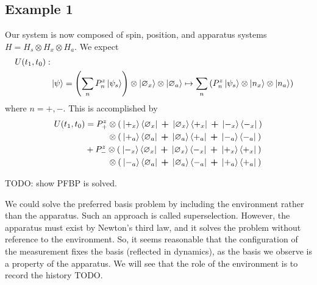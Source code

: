 \subsection{Example 1}
Our system is now composed of spin, position, and apparatus systems $H = H_s \otimes H_x \otimes H_a$. We expect
\begin{align}
    \nonumber U(t_1, t_0): \\
    & \ket{\psi} = \left(\sum_{n} P^z_n\ket{\psi_s}\right) \otimes \ket{\varnothing_x} \otimes \ket{\varnothing_a} \mapsto \sum_{n}\left(P^z_n\ket{\psi_s} \otimes \ket{n_x} \otimes \ket{n_a} \right)
\end{align}
where $n = +, -$. This is accomplished by
\begin{align}
  U(t_1, t_0) &= P^z_+ \otimes \left(\: \ket{+_x}\bra{\varnothing_x} \: \bm{+} \: \ket{\varnothing_x}\bra{+_x} \: \bm{+} \: \ket{-_x}\bra{-_x} \: \right) \\ \nonumber
  &\phantom{{}=P^z_+} \otimes \left(\: \ket{+_a}\bra{\varnothing_a} \: \bm{+} \: \ket{\varnothing_a}\bra{+_a} \: \bm{+} \: \ket{-_a}\bra{-_a} \: \right)\\ \nonumber
  &+ P^z_- \otimes \left( \: \ket{-_x}\bra{\varnothing_x} \: \bm{+} \: \ket{\varnothing_x}\bra{-_x} \: \bm{+} \: \ket{+_x}\bra{+_x} \: \right) \\ \nonumber
 &\phantom{{}=P^z_-} \otimes \left(\: \ket{-_a}\bra{\varnothing_a} \: \bm{+} \: \ket{\varnothing_a}\bra{-_a} \: \bm{+} \: \ket{+_a}\bra{+_a} \: \right)
\end{align}

TODO: show PFBP is solved.

We could solve the preferred basis problem by including the environment rather than the apparatus. Such an approach is called superselection. However, the apparatus must exist by Newton's third law, and it solves the problem without reference to the environment. So, it seems reasonable that the configuration of the measurement fixes the basis (reflected in dynamics), as the basis we observe is a property of the apparatus. We will see that the role of the environment is to record the history TODO.

